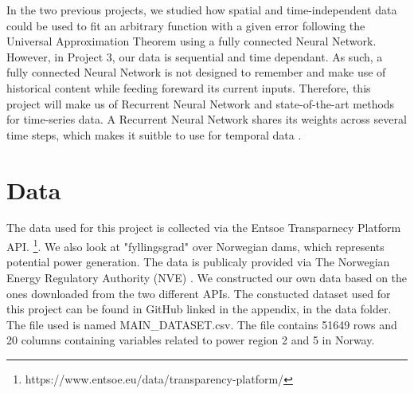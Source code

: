 \documentclass
[twocolumn,
secnumarabic,
nobibnotes,
aps,
prl,
reprint,
groupedaddress,
amsmath,
amssymb,
]{revtex4-2}
\begin{document}
In the two previous projects, we studied how spatial and time-independent data could be used to fit an arbitrary function with a given error following the Universal Approximation Theorem \cite{Nielsen2015} using a fully connected Neural Network. However, in Project 3, our data is sequential and time dependant. As such, a fully connected Neural Network is not designed to remember and make use of historical content while feeding foreward its current inputs. Therefore, this project will make us of Recurrent Neural Network and state-of-the-art methods for time-series data. A Recurrent Neural Network shares its weights across several time steps, which makes it suitble to use for temporal data \cite{Goodfellow2016}.


\section{Data}
The data used for this project is collected via the Entsoe Transparnecy Platform API. \footnote{https://www.entsoe.eu/data/transparency-platform/}. We also look at "fyllingsgrad" over Norwegian dams, which represents potential power generation. The data is publicaly provided via The Norwegian Energy Regulatory Authority (NVE) \cite{noauthor_magasinstatistikk_nodate}. 
We constructed our own data based on the ones downloaded from the two different APIs. The constucted dataset used for this project can be found in GitHub linked in the appendix, in the data folder. The file used is named MAIN\_DATASET.csv. The file contains 51649 rows and 20 columns containing variables related to power region 2 and 5 in Norway.
\end{document}
